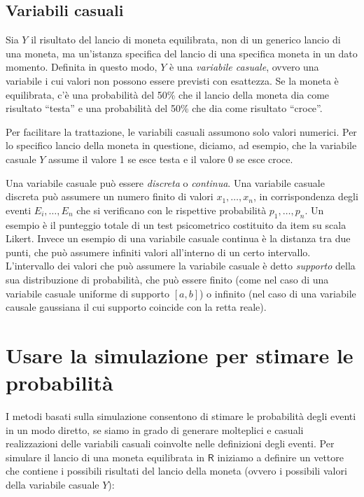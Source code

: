 \documentclass[
  11pt,
]{krantz}
\newcommand{\R}{\textsf{R}} %
\theoremstyle{definition}
\theoremstyle{definition}
\theoremstyle{definition}
\theoremstyle{definition}
\theoremstyle{remark}
\begin{document}
\hypertarget{variabili-casuali}{%
\subsection{Variabili casuali}\label{variabili-casuali}}

Sia \(Y\) il risultato del lancio di moneta equilibrata, non di un generico lancio di una moneta, ma un'istanza specifica del lancio di una specifica moneta in un dato momento. Definita in questo modo, \(Y\) è una \emph{variabile casuale}, ovvero una variabile i cui valori non possono essere previsti con esattezza. Se la moneta è equilibrata, c'è una probabilità del 50\% che il lancio della moneta dia come risultato ``testa'' e una probabilità del 50\% che dia come risultato ``croce''.

Per facilitare la trattazione, le variabili casuali assumono solo valori numerici. Per lo specifico lancio della moneta in questione, diciamo, ad esempio, che la variabile casuale \(Y\) assume il valore 1 se esce testa e il valore 0 se esce croce.

Una variabile casuale può essere \emph{discreta} o \emph{continua}. Una variabile casuale discreta può assumere un numero finito di valori \(x_1, \dots ,x_n\), in corrispondenza degli eventi \(E_i, \dots, E_n\) che si verificano con le rispettive probabilità \(p_1, \dots, p_n\). Un esempio è il punteggio totale di un test psicometrico costituito da item su scala Likert. Invece un esempio di una variabile casuale continua è la distanza tra due punti, che può assumere infiniti valori all'interno di un certo intervallo. L'intervallo dei valori che può assumere la variabile casuale è detto \emph{supporto} della sua distribuzione di probabilità, che può essere finito (come nel caso di una variabile casuale uniforme di supporto \([a, b]\)) o infinito (nel caso di una variabile causale gaussiana il cui supporto coincide con la retta reale).

\hypertarget{usare-la-simulazione-per-stimare-le-probabilituxe0}{%
\section{Usare la simulazione per stimare le probabilità}\label{usare-la-simulazione-per-stimare-le-probabilituxe0}}

I metodi basati sulla simulazione consentono di stimare le probabilità degli eventi in un modo diretto, se siamo in grado di generare molteplici e casuali realizzazioni delle variabili casuali coinvolte nelle definizioni degli eventi. Per simulare il lancio di una moneta equilibrata in \(\R\) iniziamo a definire un vettore che contiene i possibili risultati del lancio della moneta (ovvero i possibili valori della variabile casuale \(Y\)):
\end{document}
